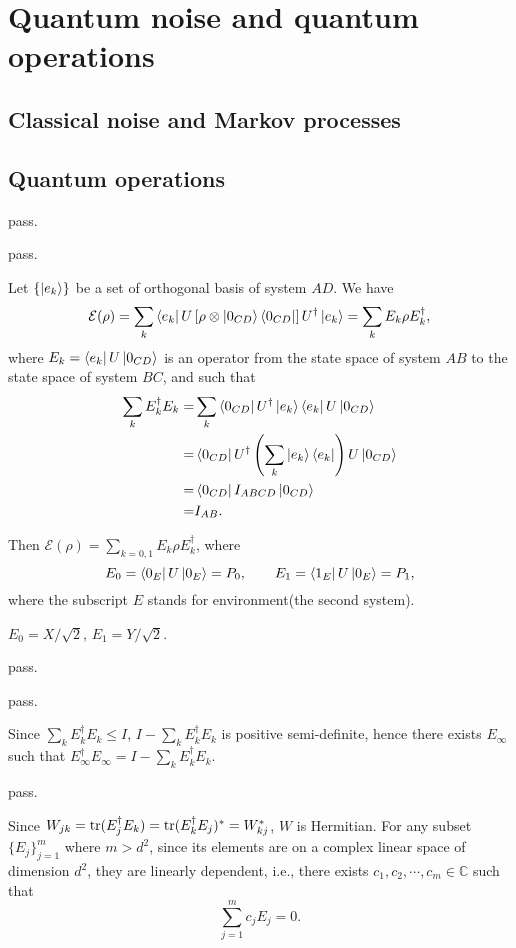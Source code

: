\chapter{Quantum noise and quantum operations}

\section{Classical noise and Markov processes}

\section{Quantum operations}

\ex pass.

\ex pass.

\ex Let $\{\left|e_k\right\rangle\}$ be a set of orthogonal basis of system $AD$.
We have
$$
\mathcal{E}(\rho) = \sum_k\left\langle e_k\right|U\left[\rho\otimes\left|0_{CD}\right\rangle\left\langle0_{CD}\right|\right]U^\dagger\left|e_k\right\rangle = \sum_kE_k\rho E_k^\dagger,
$$
where $E_k=\left\langle e_k\right|U\left|0_{CD}\right\rangle$ is an operator from the state space of system $AB$ to the state space of system $BC$, and such that
$$\begin{aligned}
    \sum_kE_k^\dagger E_k = & \sum_k\left\langle0_{CD}\right|U^\dagger\left|e_k\right\rangle\left\langle e_k\right|U\left|0_{CD}\right\rangle
    \\ = & \left\langle0_{CD}\right|U^\dagger\left(\sum_k\left|e_k\right\rangle\left\langle e_k\right|\right)U\left|0_{CD}\right\rangle
    \\ = & \left\langle0_{CD}\right|I_{ABCD}\left|0_{CD}\right\rangle
    \\ = & I_{AB}.
\end{aligned}$$

\ex Then $\mathcal{E}(\rho) = \sum_{k=0,1}E_k\rho E_k^\dagger$, where
$$
    E_0 = \left\langle0_E\right|U\left|0_E\right\rangle = P_0, \qquad
    E_1 = \left\langle1_E\right|U\left|0_E\right\rangle = P_1,
$$
where the subscript $E$ stands for environment(the second system).

\ex $E_0=X/\sqrt{2}$, $E_1=Y/\sqrt{2}$.

\ex pass.

\ex pass.

\ex Since $\sum_kE_k^\dagger E_k\le I$, $I-\sum_kE_k^\dagger E_k$ is positive semi-definite, hence there exists $E_\infty$ such that $E_\infty^\dagger E_\infty = I-\sum_kE_k^\dagger E_k$.

\ex pass.

\ex Since $W_{jk}=\operatorname{tr}(E_j^\dagger E_k)=\operatorname{tr}(E_k^\dagger E_j)^*=W_{kj}^*$, $W$ is Hermitian.
For any subset $\{E_j\}_{j=1}^{m}$ where $m>d^2$, since its elements are on a complex linear space of dimension $d^2$, they are linearly dependent, i.e., there exists $c_1,c_2,\cdots,c_m\in\mathbb{C}$ such that
$$\sum_{j=1}^{m}c_jE_j=0.$$

